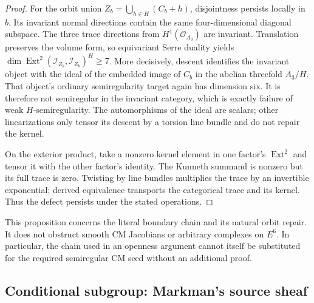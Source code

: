 \begin{proof}
For the orbit union $Z_b=\bigcup_{h\in H}(C_b+h)$, disjointness
persists locally in $b$. Its invariant normal directions contain the
same four-dimensional diagonal subspace. The three trace directions
from $H^1(\mathcal O_{A_3})$ are invariant. Translation preserves
the volume form, so equivariant Serre duality yields
$\dim\operatorname{Ext}^2(\mathcal I_{Z_b},\mathcal I_{Z_b})^H\ge7$.
More decisively, descent identifies the invariant object with the
ideal of the embedded image of $C_b$ in the abelian threefold
$A_3/H$. That object's ordinary semiregularity target again has
dimension six. It is therefore not semiregular in the invariant
category, which is exactly failure of weak $H$-semiregularity.
The automorphisms of the ideal are scalars; other linearizations
only tensor its descent by a torsion line bundle and do not repair
the kernel.

On the exterior product, take a nonzero kernel element in one
factor's $\operatorname{Ext}^2$ and tensor it with the other
factor's identity. The Kunneth summand is nonzero but its full trace
is zero. Twisting by line bundles multiplies the trace by an
invertible exponential; derived equivalence transports the
categorical trace and its kernel. Thus the defect persists under
the stated operations.
\end{proof}
This proposition concerns the literal boundary chain and its natural
orbit repair. It does not obstruct smooth CM Jacobians or arbitrary
complexes on $E^6$. In particular, the chain used in an openness
argument cannot itself be substituted for the required semiregular
CM seed without an additional proof.

\subsection{Conditional subgroup: Markman's source sheaf}
\label{sec:conditional-cm-source}

